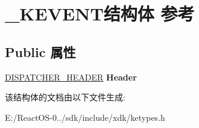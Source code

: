 \hypertarget{struct___k_e_v_e_n_t}{}\section{\+\_\+\+K\+E\+V\+E\+N\+T结构体 参考}
\label{struct___k_e_v_e_n_t}
\subsection*{Public 属性}
\begin{DoxyCompactItemize}
\item 
\mbox{\label{struct___k_e_v_e_n_t_aa99c5efa0c0284542f781c384bc080b0}} 
\hyperlink{struct___d_i_s_p_a_t_c_h_e_r___h_e_a_d_e_r}{D\+I\+S\+P\+A\+T\+C\+H\+E\+R\+\_\+\+H\+E\+A\+D\+ER} {\bfseries Header}
\end{DoxyCompactItemize}


该结构体的文档由以下文件生成\+:\begin{DoxyCompactItemize}
\item 
E\+:/\+React\+O\+S-\/0../sdk/include/xdk/ketypes.\+h\end{DoxyCompactItemize}
